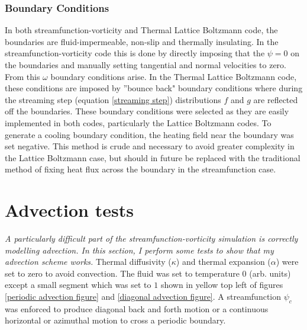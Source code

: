 \documentclass{article}
\begin{document}
\subsubsection*{Boundary Conditions}
\noindent In both streamfunction-vorticity and Thermal Lattice Boltzmann code, the 
boundaries are fluid-impermeable, non-slip and thermally insulating. In the 
streamfunction-vorticity code this is done by directly imposing that the $\psi=0$ on the boundaries and manually setting tangential and normal velocities to zero. 
From this $\omega$ boundary conditions arise. In the Thermal Lattice Boltzmann code, these conditions are imposed by ''bounce back" boundary conditions \cite{mora2020concise}
where during the streaming step (equation \ref{streaming step}) distributions $f$ and $g$ are reflected off the boundaries. These boundary conditions 
were selected as they are easily implemented in both codes, particularly the Lattice Boltzmann codes. To generate a cooling boundary condition, the 
heating field near the boundary was set negative. This method is crude and necessary to avoid greater complexity in the Lattice Boltzmann case, but 
should in future be replaced with the traditional method of fixing heat flux across the boundary in the streamfunction case.


\section*{Advection tests}
{\it{A particularly difficult part of the streamfunction-vorticity simulation is correctly modelling advection. In this section, I perform some tests to show that my advection scheme works.}}
\vspace{0.3cm}
\newline
\noindent Thermal diffusivity ($\kappa$) and thermal expansion ($\alpha$) were set to zero to avoid convection. The fluid was set to temperature 0 (arb. units) except a small segment which was set to $1$ shown in yellow top left of figures \ref{periodic advection figure} and \ref{diagonal advection figure}. A streamfunction $\psi_c$ was enforced to produce diagonal back and forth motion or a continuous horizontal or azimuthal motion to cross a periodic boundary.
\end{document}
